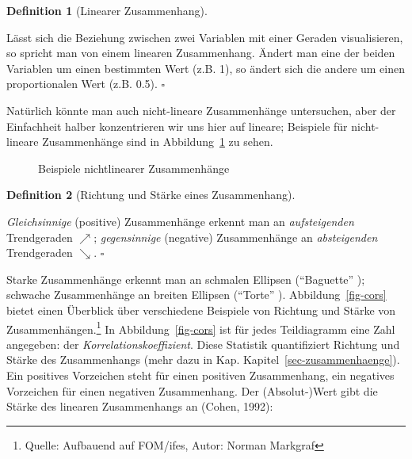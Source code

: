 \documentclass[
  letterpaper,
  twoside,
  open=any]{scrbook}
\theoremstyle{definition}
\theoremstyle{definition}
\theoremstyle{definition}
\newtheorem{definition}{Definition}[chapter]
\theoremstyle{remark}
\begin{document}
\begin{definition}[Linearer
Zusammenhang]\protect\hypertarget{def-lin-zshg}{}\label{def-lin-zshg}

Lässt sich die Beziehung zwischen zwei Variablen mit einer Geraden
visualisieren, so spricht man von einem linearen Zusammenhang. Ändert
man eine der beiden Variablen um einen bestimmten Wert (z.B. 1), so
ändert sich die andere um einen proportionalen Wert (z.B. 0.5).
\(\square\)

\end{definition}

Natürlich könnte man auch nicht-lineare Zusammenhänge untersuchen, aber
der Einfachheit halber konzentrieren wir uns hier auf lineare; Beispiele
für nicht-lineare Zusammenhänge sind in Abbildung~\ref{fig-nonlinear} zu
sehen.

\begin{figure}


\caption{\label{fig-nonlinear}Beispiele nichtlinearer Zusammenhänge}

\end{figure}%

\begin{definition}[Richtung und Stärke eines
Zusammenhang]\protect\hypertarget{def-zshg}{}\label{def-zshg}

\emph{Gleichsinnige} (positive) Zusammenhänge erkennt man an
\emph{aufsteigenden} Trendgeraden \(\nearrow\); \emph{gegensinnige}
(negative) Zusammenhänge an \emph{absteigenden} Trendgeraden
\(\searrow\). \(\square\)

\end{definition}

Starke Zusammenhänge erkennt man an schmalen Ellipsen
(\enquote{Baguette} ); schwache Zusammenhänge an breiten Ellipsen
(\enquote{Torte} ). Abbildung~\ref{fig-cors} bietet einen Überblick über
verschiedene Beispiele von Richtung und Stärke von
Zusammenhängen.\footnote{Quelle: Aufbauend auf FOM/ifes, Autor: Norman
  Markgraf} In Abbildung~\ref{fig-cors} ist für jedes Teildiagramm eine
Zahl angegeben: der \emph{Korrelationskoeffizient}. Diese Statistik
quantifiziert Richtung und Stärke des Zusammenhangs (mehr dazu in Kap.
Kapitel~\ref{sec-zusammenhaenge}). Ein positives Vorzeichen steht für
einen positiven Zusammenhang, ein negatives Vorzeichen für einen
negativen Zusammenhang. Der (Absolut-)Wert gibt die Stärke des linearen
Zusammenhangs an (Cohen, 1992):
\end{document}
